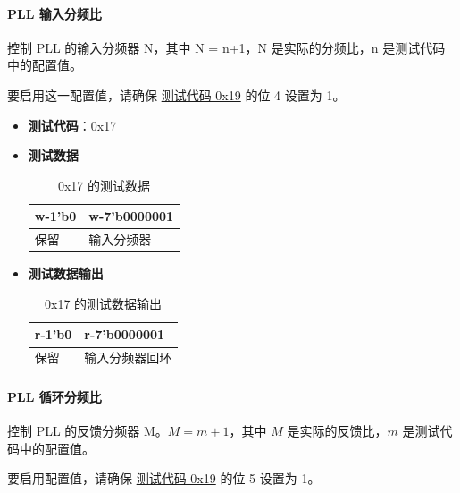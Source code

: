 \documentclass[main\_\_CN.tex]{subfiles}
\begin{document}
\paragraph{PLL 输入分频比}
\label{sec:test-code-0x17}
控制 PLL 的输入分频器 N，其中 N = n+1，N 是实际的分频比，n 是测试代码中的配置值。

要启用这一配置值，请确保 \hyperref[sec:test-code-0x19]{测试代码 0x19} 的位 4 设置为 1。

\begin{itemize}
    \item \textbf{测试代码}：0x17
    \item \textbf{测试数据}
        \begin{longtable}{ |p{6cm}|p{6cm}|}
            \caption{0x17 的测试数据}
            \label{tab:test-data-0x17} \\
            \hline
            \rowcolor{lightgray}
            \textbf{w-1'b0} & \textbf{w-7'b0000001} \\ \hline
            保留 & 输入分频器  \\ \hline
        \end{longtable}
    \item \textbf{测试数据输出}
        \begin{longtable}{ |p{6cm}|p{6cm}|}
            \caption{0x17 的测试数据输出}
            \label{tab:test-dout-0x17} \\
            \hline
            \rowcolor{lightgray}
            \textbf{r-1'b0} & \textbf{r-7'b0000001} \\ \hline
            保留 & 输入分频器回环 \\ \hline
        \end{longtable}
\end{itemize}

\paragraph{PLL 循环分频比}
\label{sec:test-code-0x18}
控制 PLL 的反馈分频器 M。$M = m+1$，其中 $M$ 是实际的反馈比，$m$ 是测试代码中的配置值。

要启用配置值，请确保 \hyperref[sec:test-code-0x19]{测试代码 0x19} 的位 5 设置为 1。
\end{document}
